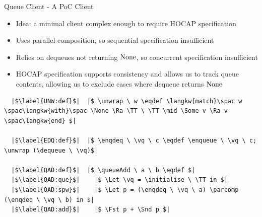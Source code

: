 \documentclass[9pt]{beamer}
\newcommand{\initialise}{\operatorname{initialize}}
\newcommand{\enqueue}{\operatorname{enqueue}}
\newcommand{\dequeue}{\operatorname{dequeue}}
\newcommand{\unwrap}{\operatorname{unwrap}}
\newcommand{\enqdeq}{\operatorname{enqdeq}}
\newcommand{\queueAdd}{\operatorname{queueAdd}}
\newcommand{\parcomp}{\ensuremath{\mathbin{||}}}
\newcommand{\vq}{v_q}
\begin{document}
\begin{frame}[fragile]{Queue Client - A PoC Client}
  \begin{itemize}
    \item Idea: a minimal client complex enough to require HOCAP specification
    \item Uses parallel composition, so sequential specification insufficient
    \item Relies on dequeues not returning $\operatorname{None}$, so concurrent specification insufficient
    \item HOCAP specification supports consistency and allows us to track queue contents, allowing us to exclude cases where dequeue returns $\operatorname{None}$ 
  \end{itemize}
  \begin{verbatim}
  |$\label{UNW:def}$|  |$ \unwrap \ w \eqdef \langkw{match}\spac w \spac\langkw{with}\spac \None \Ra \TT \ \TT \mid \Some v \Ra v \spac\langkw{end} $|
  
  |$\label{EDQ:def}$|  |$ \enqdeq \ \vq \ c \eqdef \enqueue \ \vq \ c; \unwrap (\dequeue \ \vq)$|
  
  |$\label{QAD:def}$|  |$ \queueAdd \ a \ b \eqdef $|
  |$\label{QAD:que}$|    |$ \Let \vq = \initialise \ \TT in $|
  |$\label{QAD:spw}$|    |$ \Let p = (\enqdeq \ \vq \ a) \parcomp (\enqdeq \ \vq \ b) in $|
  |$\label{QAD:add}$|    |$ \Fst p + \Snd p $|
  \end{verbatim}
\end{frame}
\end{document}

